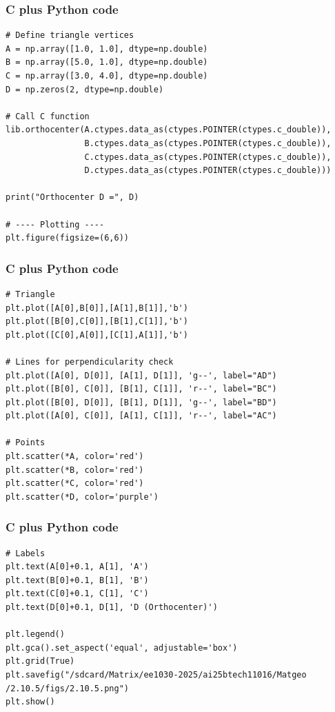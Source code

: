 \documentclass{beamer}
\begin{document}
\begin{frame}[fragile]
    \frametitle{C plus Python code}
    \begin{lstlisting}
# Define triangle vertices
A = np.array([1.0, 1.0], dtype=np.double)
B = np.array([5.0, 1.0], dtype=np.double)
C = np.array([3.0, 4.0], dtype=np.double)
D = np.zeros(2, dtype=np.double)

# Call C function
lib.orthocenter(A.ctypes.data_as(ctypes.POINTER(ctypes.c_double)),
                B.ctypes.data_as(ctypes.POINTER(ctypes.c_double)),
                C.ctypes.data_as(ctypes.POINTER(ctypes.c_double)),
                D.ctypes.data_as(ctypes.POINTER(ctypes.c_double)))

print("Orthocenter D =", D)

# ---- Plotting ----
plt.figure(figsize=(6,6))
\end{lstlisting}
 
\end{frame}
\begin{frame}[fragile]
    \frametitle{C plus Python code}
    \begin{lstlisting}
# Triangle
plt.plot([A[0],B[0]],[A[1],B[1]],'b')
plt.plot([B[0],C[0]],[B[1],C[1]],'b')
plt.plot([C[0],A[0]],[C[1],A[1]],'b')

# Lines for perpendicularity check
plt.plot([A[0], D[0]], [A[1], D[1]], 'g--', label="AD")
plt.plot([B[0], C[0]], [B[1], C[1]], 'r--', label="BC")
plt.plot([B[0], D[0]], [B[1], D[1]], 'g--', label="BD")
plt.plot([A[0], C[0]], [A[1], C[1]], 'r--', label="AC")

# Points
plt.scatter(*A, color='red')
plt.scatter(*B, color='red')
plt.scatter(*C, color='red')
plt.scatter(*D, color='purple')
\end{lstlisting}
 
\end{frame}
\begin{frame}[fragile]
    \frametitle{C plus Python code}
    \begin{lstlisting}
# Labels
plt.text(A[0]+0.1, A[1], 'A')
plt.text(B[0]+0.1, B[1], 'B')
plt.text(C[0]+0.1, C[1], 'C')
plt.text(D[0]+0.1, D[1], 'D (Orthocenter)')

plt.legend()
plt.gca().set_aspect('equal', adjustable='box')
plt.grid(True)
plt.savefig("/sdcard/Matrix/ee1030-2025/ai25btech11016/Matgeo
/2.10.5/figs/2.10.5.png")
plt.show()


\end{lstlisting}
 
\end{frame}
\end{document}
